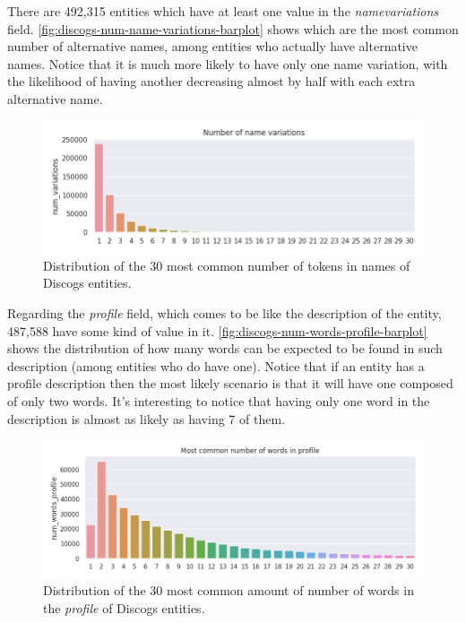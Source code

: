 \documentclass[epsfig,a4paper,11pt,titlepage,twoside,openany]{book}
\begin{document}
There are 492,315 entities which have at least one value in the \textit{namevariations} field. \autoref{fig:discogs-num-name-variations-barplot} shows which are the most common number of alternative names, among entities who actually have alternative names. Notice that it is much more likely to have only one name variation, with the likelihood of having another decreasing almost by half with each extra alternative name.

\begin{figure}[H]
  \centering \includegraphics[width=\textwidth]{discogs_num_name_variations} 
  \caption{Distribution of the 30 most common number of tokens in names of Discogs entities.}
  \label{fig:discogs-num-name-variations-barplot}
\end{figure}


Regarding the \textit{profile} field, which comes to be like the description of the entity, 487,588 have some kind of value in it. \autoref{fig:discogs-num-words-profile-barplot} shows the distribution of how many words can be expected to be found in such description (among entities who do have one). Notice that if an entity has a profile description then the most likely scenario is that it will have one composed of only two words. It's interesting to notice that having only one word in the description is almost as likely as having 7 of them. 

\begin{figure}[H]
  \centering \includegraphics[width=\textwidth]{discogs_num_words_profile} 
  \caption{Distribution of the 30 most common amount of number of words in the \textit{profile} of Discogs entities.}
  \label{fig:discogs-num-words-profile-barplot}
\end{figure}
\end{document}
